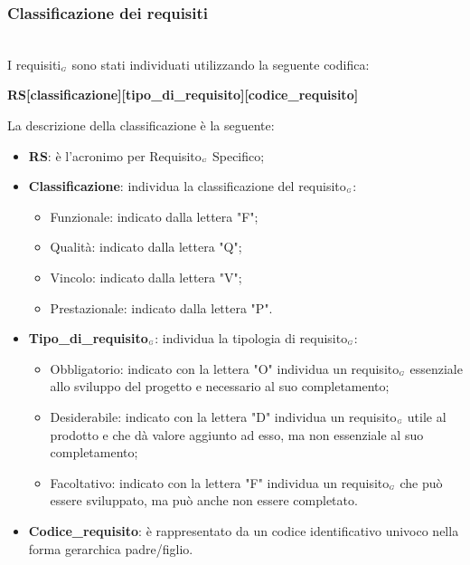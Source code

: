 \subsubsection{Classificazione dei requisiti}\label{ProcessiPrimariProspettiveAnalisiDeiRequisitiClassificazioneDeiRequisiti}\mbox{}\\%
I requisiti$_{\scaleto{G}{3pt}}$ sono stati individuati utilizzando la seguente codifica:
\begin{center}
	\textbf{RS[classificazione][tipo\_di\_requisito][codice\_requisito]}
\end{center}
La descrizione della classificazione è la seguente:
\begin{itemize}
	\item \textbf{RS}: è l'acronimo per Requisito$_{\scaleto{G}{3pt}}$ Specifico;
	\item \textbf{Classificazione}: individua la classificazione del requisito$_{\scaleto{G}{3pt}}$:
	\begin{itemize}
		\item Funzionale: indicato dalla lettera "F";
		\item Qualità: indicato dalla lettera "Q";
		\item Vincolo: indicato dalla lettera "V";
		\item Prestazionale: indicato dalla lettera "P".
	\end{itemize}
	\item \textbf{Tipo\_di\_requisito$_{\scaleto{G}{3pt}}$}: individua la tipologia di requisito$_{\scaleto{G}{3pt}}$:
	\begin{itemize}
		\item Obbligatorio: indicato con la lettera "O" individua un requisito$_{\scaleto{G}{3pt}}$ essenziale allo sviluppo del progetto e necessario al suo completamento;
		\item Desiderabile: indicato con la lettera "D" individua un requisito$_{\scaleto{G}{3pt}}$ utile al prodotto e che dà valore aggiunto ad esso, ma non essenziale al suo completamento;
		\item Facoltativo: indicato con la lettera "F" individua un requisito$_{\scaleto{G}{3pt}}$ che può essere sviluppato, ma può anche non essere completato.
	\end{itemize}
	\item \textbf{Codice\_requisito}: è rappresentato da un codice identificativo univoco nella forma gerarchica padre/figlio.
\end{itemize}
